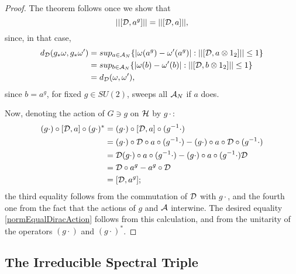 \begin{proof}
The theorem follows once we show that 
\begin{equation}\label{normEqualDiracAction}
    ||[\mathcal D, a^g]|| = ||[\mathcal D, a]||,
\end{equation} since, in that case,
\begin{align*}
d_\mathcal D(g_* \omega, g_* \omega') &= sup_{a \in \mathcal A_N}\{ |\omega(a^g) - \omega'(a^g)|: ||[\mathcal D, a \otimes 1_2]|| \leq 1 \} \\
    &= sup_{b \in \mathcal A_N}\{ |\omega(b) - \omega'(b)|: ||[\mathcal D, b \otimes 1_2]|| \leq 1 \} \\
    &= d_\mathcal D(\omega, \omega'),
\end{align*}
since $b = a^g$, for fixed $g \in SU(2)$, sweeps all $\mathcal A_N$ if $a$ does.

Now, denoting the action of $G \ni g$ on $\mathcal H$ by $g \cdot$:
\begin{align*}
    (g \cdot) \circ [\mathcal D, a]\circ (g\cdot )^* &= (g \cdot) \circ [\mathcal D, a]\circ (g^{-1}\cdot )\\
        &= (g \cdot) \circ \mathcal D \circ a \circ (g^{-1}\cdot ) - (g \cdot) \circ a \circ  \mathcal D \circ (g^{-1}\cdot )\\
        &= \mathcal D (g \cdot) \circ a\circ (g^{-1}\cdot ) - (g \cdot) \circ a\circ (g^{-1}\cdot ) \mathcal D  \\
        &= \mathcal D \circ a^g - a^g \circ \mathcal D\\
        & = [\mathcal D, a^g];
\end{align*} 
the third equality follows from the commutation of $\mathcal D$ with $g\cdot$, and the fourth one from the fact that the actions of $g$ and $\mathcal A$ interwine. The desired equality \eqref{normEqualDiracAction} follows from this calculation, and from the unitarity of the operators $(g \cdot)$ and $(g\cdot)^*$.
\end{proof}

\subsection{The Irreducible Spectral Triple}
 
 


